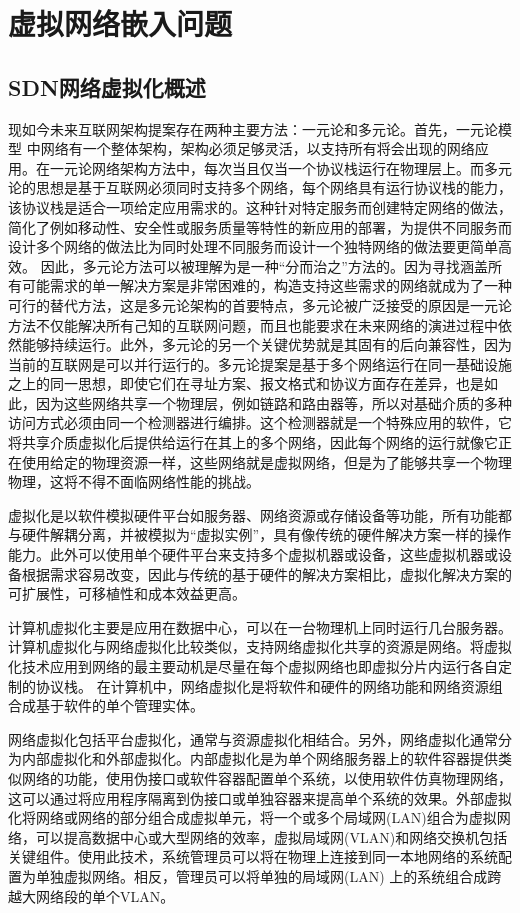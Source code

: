 \chapter{虚拟网络嵌入问题}
\section{SDN网络虚拟化概述}
现如今未来互联网架构提案存在两种主要方法：一元论和多元论。首先，一元论模型 中网络有一个整体架构，架构必须足够灵活，以支持所有将会出现的网络应用。在一元论网络架构方法中，每次当且仅当一个协议栈运行在物理层上。而多元论的思想是基于互联网必须同时支持多个网络，每个网络具有运行协议栈的能力，该协议栈是适合一项给定应用需求的。这种针对特定服务而创建特定网络的做法，简化了例如移动性、安全性或服务质量等特性的新应用的部署，为提供不同服务而设计多个网络的做法比为同时处理不同服务而设计一个独特网络的做法要更简单高效。 因此，多元论方法可以被理解为是一种“分而治之”方法的。因为寻找涵盖所有可能需求的单一解决方案是非常困难的，构造支持这些需求的网络就成为了一种可行的替代方法，这是多元论架构的首要特点，多元论被广泛接受的原因是一元论方法不仅能解决所有己知的互联网问题，而且也能要求在未来网络的演进过程中依然能够持续运行。此外，多元论的另一个关键优势就是其固有的后向兼容性，因为当前的互联网是可以并行运行的。多元论提案是基于多个网络运行在同一基础设施之上的同一思想，即使它们在寻址方案、报文格式和协议方面存在差异，也是如此，因为这些网络共享一个物理层，例如链路和路由器等，所以对基础介质的多种访问方式必须由同一个检测器进行编排。这个检测器就是一个特殊应用的软件，它将共享介质虚拟化后提供给运行在其上的多个网络，因此每个网络的运行就像它正在使用给定的物理资源一样，这些网络就是虚拟网络，但是为了能够共享一个物理物理，这将不得不面临网络性能的挑战。

虚拟化是以软件模拟硬件平台如服务器、网络资源或存储设备等功能，所有功能都与硬件解耦分离，并被模拟为“虚拟实例”，具有像传统的硬件解决方案一样的操作能力。此外可以使用单个硬件平台来支持多个虚拟机器或设备，这些虚拟机器或设备根据需求容易改变，因此与传统的基于硬件的解决方案相比，虚拟化解决方案的可扩展性，可移植性和成本效益更高。

计算机虚拟化主要是应用在数据中心，可以在一台物理机上同时运行几台服务器。计算机虚拟化与网络虚拟化比较类似，支持网络虚拟化共享的资源是网络。将虚拟化技术应用到网络的最主要动机是尽量在每个虚拟网络也即虚拟分片内运行各自定制的协议栈。 在计算机中，网络虚拟化是将软件和硬件的网络功能和网络资源组合成基于软件的单个管理实体。

网络虚拟化包括平台虚拟化，通常与资源虚拟化相结合。另外，网络虚拟化通常分为内部虚拟化和外部虚拟化。内部虚拟化是为单个网络服务器上的软件容器提供类似网络的功能，使用伪接口或软件容器配置单个系统，以使用软件仿真物理网络，这可以通过将应用程序隔离到伪接口或单独容器来提高单个系统的效果。外部虚拟化将网络或网络的部分组合成虚拟单元，将一个或多个局域网(LAN)组合为虚拟网络，可以提高数据中心或大型网络的效率，虚拟局域网(VLAN)和网络交换机包括关键组件。使用此技术，系统管理员可以将在物理上连接到同一本地网络的系统配置为单独虚拟网络。相反，管理员可以将单独的局域网(LAN) 上的系统组合成跨越大网络段的单个VLAN。



